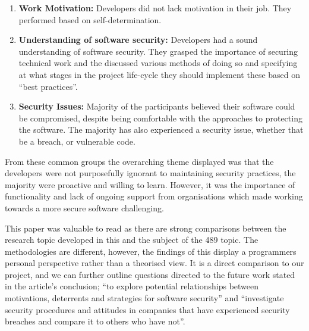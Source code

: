 \begin{enumerate}
\item \textbf{Work Motivation:} Developers did not lack motivation in their job. They performed based on self-determination.
\item \textbf{Understanding of software security:} Developers had a sound understanding of software security. They grasped the importance of securing technical work and the discussed various methods of doing so and specifying at what stages in the project life-cycle they should implement these based on “best practices”.
\item \textbf{Security Issues:} Majority of the participants believed their software could be compromised, despite being comfortable with the approaches to protecting the software. The majority has also experienced a security issue, whether that be a breach, or vulnerable code.
\end{enumerate}

\par From these common groups the overarching theme displayed was that the developers were not purposefully ignorant to maintaining security practices, the majority were proactive and willing to learn. However, it was the importance of functionality and lack of ongoing support from organisations which made working towards a more secure software challenging. 
\newline
\par This paper was valuable to read as there are strong comparisons between the research topic developed in this and the subject of the 489 topic. The methodologies are different, however, the findings of this display a programmers personal perspective rather than a theorised view. It is a direct comparison to our project, and we can further outline questions directed to the future work stated in the article's conclusion; “to explore potential relationships between motivations, deterrents and strategies for software security” and “investigate security procedures and attitudes in companies that have experienced security breaches and compare it to others who have not”.

